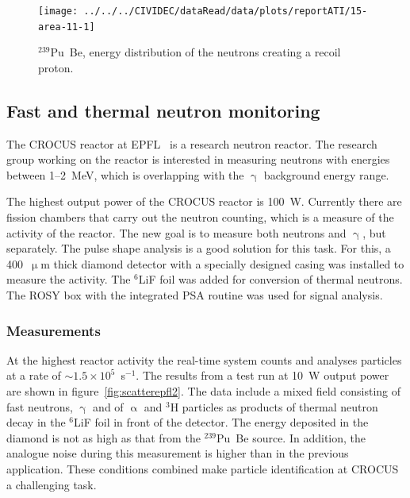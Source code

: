 \begin{figure}[!t]
\centering
\texttt{[image: ../../../CIVIDEC/dataRead/data/plots/reportATI/15-area-11-1]}
\caption{$^{239}$Pu~Be, energy distribution of the neutrons creating a recoil proton.}
\label{fig:scatterpuarea}
\end{figure}







\newpage\null\thispagestyle{empty}\newpage
\clearpage
\subsection{Fast and thermal neutron monitoring}
The CROCUS reactor at EPFL~\cite{EPFL:00000} is a research neutron reactor. The research group working on the reactor is interested in measuring neutrons with energies between 1--2~MeV, which is overlapping with the $\upgamma$ background energy range.

The highest output power of the CROCUS reactor is 100~W. Currently there are fission chambers that carry out the neutron counting, which is a measure of the activity of the reactor. The new goal is to measure both neutrons and $\upgamma$, but separately. The pulse shape analysis is a good solution for this task. For this, a 400~$\upmu$m thick diamond detector with a specially designed casing was installed to measure the activity. The $^6$LiF foil was added for conversion of thermal neutrons. The ROSY box with the integrated PSA routine was used for signal analysis.

\subsubsection{Measurements}
At the highest reactor activity the real-time system counts and analyses particles at a rate of $\sim1.5\times10^{5}$~s$^{-1}$. The results from a test run at 10~W output power are shown in figure~\ref{fig:scatterepfl2}. The data include a mixed field consisting of fast neutrons, $\upgamma$ and of $\upalpha$ and $^3$H particles as products of thermal neutron decay in the $^6$LiF foil in front of the detector. The energy deposited in the diamond is not as high as that from the $^{239}$Pu~Be source. In addition, the analogue noise during this measurement is higher than in the previous application. These conditions combined make particle identification at CROCUS a challenging task.


